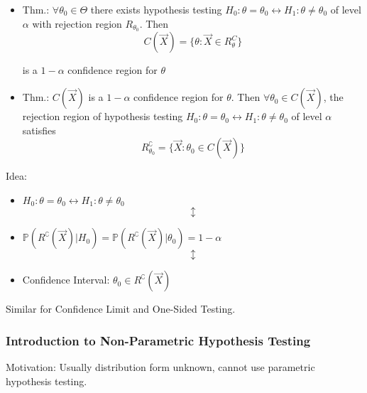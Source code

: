 \begin{itemize}
    \item Thm.: $\forall\theta_0\in\Theta$ there exists hypothesis testing $H_0:\theta=\theta_0\longleftrightarrow H_1:\theta\neq\theta_0$ of level $\alpha$ with rejection region $R_{\theta_0}$. Then
    \begin{equation}
        C(\vec{X})=\{\theta:\vec{X}\in R^C_{\theta}\}
    \end{equation}

    is a $1-\alpha$ confidence region for $\theta$

    \item Thm.: $C(\vec{X})$ is a $1-\alpha$ confidence region for $\theta$. Then $\forall\theta_0\in C(\vec{X})$, the rejection region of hypothesis testing $H_0:\theta=\theta_0\longleftrightarrow H_1:\theta\neq\theta_0$ of level $\alpha$ satisfies
    \begin{equation}
    R^\complement_{\theta_0}=\{\vec{X}:\theta_0\in C(\vec{X})\}
    \end{equation}
\end{itemize}
    
    \begin{point}
        Idea:
    \end{point}
    
        
\begin{itemize}[itemsep=-3pt]
    \item[] \centering $H_0:\theta=\theta_0\longleftrightarrow H_1:\theta\neq\theta_0$
    \begin{equation}\updownarrow\end{equation}
    \item[] \centering $\mathbb{P}(R^\complement(\vec{X})|H_0)=\mathbb{P}(R^\complement(\vec{X})|\theta_0)=1-\alpha$
    \begin{equation}\updownarrow\end{equation}
    \item[] Confidence Interval: $\theta_0\in R^\complement(\vec{X})$
\end{itemize}

    Similar for Confidence Limit and One-Sided Testing.

\subsubsection{Introduction to Non-Parametric Hypothesis Testing}\label{SubSectionIntroToNonParametricHypothesisTesting}

    Motivation: Usually distribution form unknown, cannot use parametric hypothesis testing.

